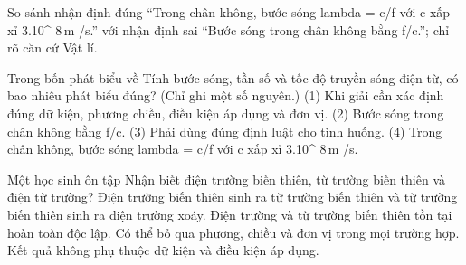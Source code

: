 \begin{bt}
So sánh nhận định đúng “Trong chân không, bước sóng lambda = c/f với c xấp xỉ 3.10^ $8\,\text{m}$ /s.” với nhận định sai “Bước sóng trong chân không bằng f/c.”; chỉ rõ căn cứ Vật lí.
\end{bt}

\begin{ex}
Trong bốn phát biểu về Tính bước sóng, tần số và tốc độ truyền sóng điện từ, có bao nhiêu phát biểu đúng? (Chỉ ghi một số nguyên.) (1) Khi giải cần xác định đúng dữ kiện, phương chiều, điều kiện áp dụng và đơn vị. (2) Bước sóng trong chân không bằng f/c. (3) Phải dùng đúng định luật cho tình huống. (4) Trong chân không, bước sóng lambda = c/f với c xấp xỉ 3.10^ $8\,\text{m}$ /s.
\end{ex}

\begin{ex}
Một học sinh ôn tập Nhận biết điện trường biến thiên, từ trường biến thiên và điện từ trường?
\choice
{\True Điện trường biến thiên sinh ra từ trường biến thiên và từ trường biến thiên sinh ra điện trường xoáy.}
{Điện trường và từ trường biến thiên tồn tại hoàn toàn độc lập.}
{Có thể bỏ qua phương, chiều và đơn vị trong mọi trường hợp.}
{Kết quả không phụ thuộc dữ kiện và điều kiện áp dụng.}
\end{ex}

